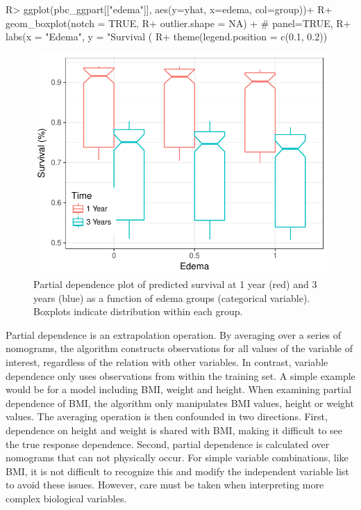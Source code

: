 \documentclass[article]{jss}
\begin{document}
\begin{Schunk}
\begin{Sinput}
R> ggplot(pbc_ggpart[["edema"]], aes(y=yhat, x=edema, col=group))+
R+   geom_boxplot(notch = TRUE,
R+                outlier.shape = NA) + # panel=TRUE,
R+   labs(x = "Edema", y = "Survival (%
R+   theme(legend.position = c(0.1, 0.2))
\end{Sinput}
\begin{figure}[!htb]

{\centering \includegraphics{rfs-pbc-partial-edema-1} 

}

\caption[Partial dependence plot of predicted survival at 1 year (red) and 3 years (blue) as a function of edema groups (categorical variable)]{Partial dependence plot of predicted survival at 1 year (red) and 3 years (blue) as a function of edema groups (categorical variable). Boxplots indicate distribution within each group.}\label{fig:pbc-partial-edema}
\end{figure}
\end{Schunk}

Partial dependence is an extrapolation operation. By averaging over a
series of nomograms, the algorithm constructs observations for all
values of the variable of interest, regardless of the relation with
other variables. In contrast, variable dependence only uses observations
from within the training set. A simple example would be for a model
including BMI, weight and height. When examining partial dependence of
BMI, the algorithm only manipulates BMI values, height or weight values.
The averaging operation is then confounded in two directions. First,
dependence on height and weight is shared with BMI, making it difficult
to see the true response dependence. Second, partial dependence is
calculated over nomograms that can not physically occur. For simple
variable combinations, like BMI, it is not difficult to recognize this
and modify the independent variable list to avoid these issues. However,
care must be taken when interpreting more complex biological variables.
\end{document}
